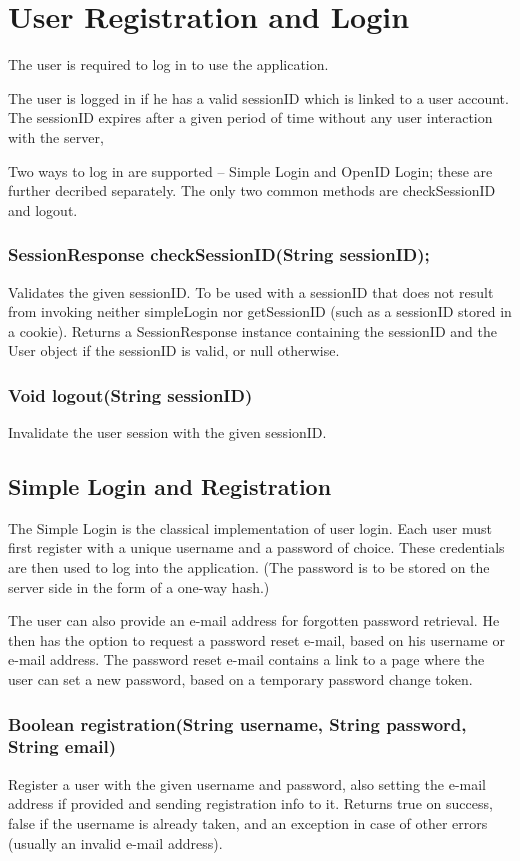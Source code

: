 \section{User Registration and Login}

The user is required to log in to use the application.

The user is logged in if he has a valid sessionID which is linked to a user account.
The sessionID expires after a given period of time without any user interaction with the server,

Two ways to log in are supported -- Simple Login and OpenID Login; these are further decribed separately. The only two common methods are checkSessionID and logout.

\subsubsection{SessionResponse checkSessionID(String sessionID);}
Validates the given sessionID. To be used with a sessionID that does not result from invoking neither simpleLogin nor getSessionID (such as a sessionID stored in a cookie).
Returns a SessionResponse instance containing the sessionID and the User object if the sessionID is valid, or null otherwise.

\subsubsection{Void logout(String sessionID)}
Invalidate the user session with the given sessionID.

\subsection{Simple Login and Registration}
\label{subsec:simple_login}

The Simple Login is the classical implementation of user login. Each user must first register with a unique username and a password of choice. These credentials are then used to log into the application. (The password is to be stored on the server side in the form of a one-way hash.)

The user can also provide an e-mail address for forgotten password retrieval. He then has the option to request a password reset e-mail, based on his username or e-mail address. The password reset e-mail contains a link to a page where the user can set a new password, based on a temporary password change token.

\subsubsection{Boolean registration(String username, String password, String email)}
Register a user with the given username and password, also setting the e-mail address if provided and sending registration info to it.
Returns true on success, false if the username is already taken, and an exception in case of other errors (usually an invalid e-mail address).

